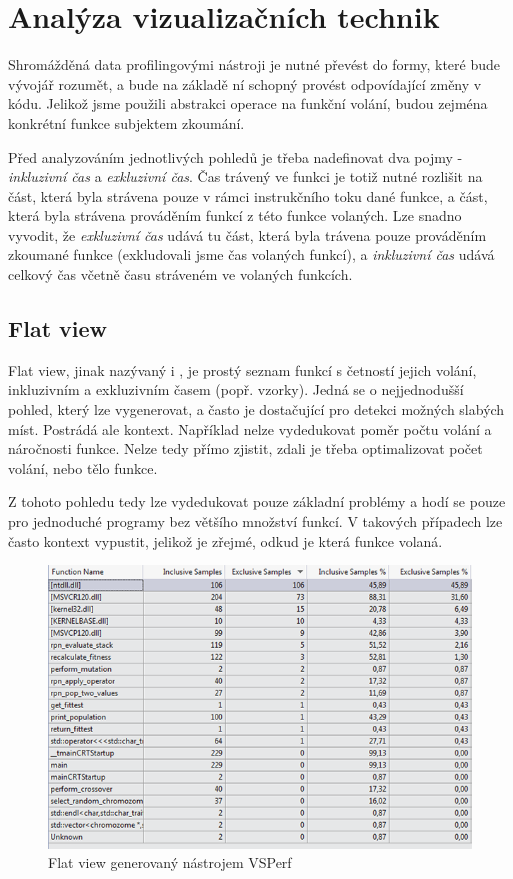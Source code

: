 \documentclass[czech,BP]{thesiskiv}
\begin{document}
\newpage

\chapter{Analýza vizualizačních technik}

Shromážděná data profilingovými nástroji je nutné převést do formy, které bude vývojář rozumět, a bude na základě ní schopný provést odpovídající změny v kódu. Jelikož jsme použili abstrakci operace na funkční volání, budou zejména konkrétní funkce subjektem zkoumání.

Před analyzováním jednotlivých pohledů je třeba nadefinovat dva pojmy - \emph{inkluzivní čas} a \emph{exkluzivní čas}. Čas trávený ve funkci je totiž nutné rozlišit na část, která byla strávena pouze v rámci instrukčního toku dané funkce, a část, která byla strávena prováděním funkcí z této funkce volaných. Lze snadno vyvodit, že \emph{exkluzivní čas} udává tu část, která byla trávena pouze prováděním zkoumané funkce (exkludovali jsme čas volaných funkcí), a \emph{inkluzivní čas} udává celkový čas včetně času stráveném ve volaných funkcích.

\section{Flat view}

Flat view, jinak nazývaný i , je prostý seznam funkcí s četností jejich volání, inkluzivním a exkluzivním časem (popř. vzorky). Jedná se o nejjednodušší pohled, který lze vygenerovat, a často je dostačující pro detekci možných slabých míst. Postrádá ale kontext. Například nelze vydedukovat poměr počtu volání a náročnosti funkce. Nelze tedy přímo zjistit, zdali je třeba optimalizovat počet volání, nebo tělo funkce.

Z tohoto pohledu tedy lze vydedukovat pouze základní problémy a hodí se pouze pro jednoduché programy bez většího množství funkcí. V takových případech lze často kontext vypustit, jelikož je zřejmé, odkud je která funkce volaná.

\begin{figure}[h]
    \centering
    \includegraphics[interpolate,width=1.0\textwidth]{img/prof_flatview.png}
    \caption{Flat view generovaný nástrojem VSPerf}
    \label{obr:flatview}
\end{figure}
\end{document}
